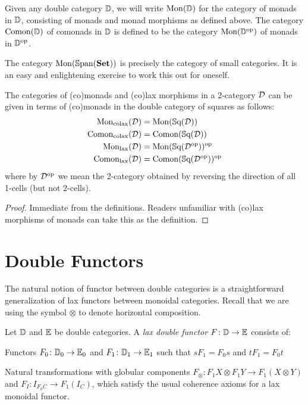 \begin{definition}
	Given any double category $\mathbb{D}$, we will write $\mathrm{Mon}(\mathbb{D})$ for the category of monads in $\mathbb{D}$, consisting of monads and monad morphisms as defined above. The category $\mathrm{Comon}(\mathbb{D})$ of comonads in $\mathbb{D}$ is defined to be the category $\mathrm{Mon}(\mathbb{D}^{\text{op}})$ of monads in $\mathbb{D}^{\text{op}}$.
\end{definition}

\begin{example}
	The category $\mathrm{Mon}(\mathbb{S}\mathrm{pan}(\mathbf{Set}))$ is precisely the category of small categories. It is an easy and enlightening exercise to work this out for oneself.
\end{example}

\begin{proposition}
	The categories of (co)monads and (co)lax morphisms in a 2-category $\mathcal{D}$ can be given in terms of (co)monads in the double category of squares as follows:
	\begin{align*}
		\mathrm{Mon}_{\text{colax}}(\mathcal{D}) &= \mathrm{Mon}(\mathbb{S}\mathrm{q}(\mathcal{D})) \\
		\mathrm{Comon}_{\text{colax}}(\mathcal{D}) &= \mathrm{Comon}(\mathbb{S}\mathrm{q}(\mathcal{D})) \\
		\mathrm{Mon}_{\text{lax}}(\mathcal{D}) &= \mathrm{Mon}(\mathbb{S}\mathrm{q}(\mathcal{D}^{\text{op}}))^{\text{op}} \\
		\mathrm{Comon}_{\text{lax}}(\mathcal{D}) &= \mathrm{Comon}(\mathbb{S}\mathrm{q}(\mathcal{D}^{\text{op}}))^{\text{op}}
	\end{align*}
	where by $\mathcal{D}^{\text{op}}$ we mean the 2-category obtained by reversing the direction of all 1-cells (but not 2-cells).
\end{proposition}
\begin{proof}
	Immediate from the definitions. Readers unfamiliar with (co)lax morphisms of monads can take this as the definition.
\end{proof}

\section{Double Functors}

The natural notion of functor between double categories is a straightforward generalization of lax functors between monoidal categories. Recall that we are using the symbol $\otimes$ to denote horizontal composition.

\begin{definition}\label{Def:LaxDblFunc}
	Let $\mathbb{D}$ and $\mathbb{E}$ be double categories. A \emph{lax double functor} $F\colon\mathbb{D}\to\mathbb{E}$ consists of:
	\begin{compactitem}
		\item Functors $F_0\colon\mathbb{D}_0 \to\mathbb{E}_0$ and $F_1\colon\mathbb{D}_1 \to\mathbb{E}_1$ such that $sF_1=F_0s$ and $tF_1=F_0t$
		\item Natural transformations with globular components $F_{\otimes}\colon F_1X\otimes F_1Y\to F_1(X\otimes Y)$ and $F_I\colon I_{F_0C}\to F_1(I_C)$, which satisfy the usual coherence axioms for a lax monoidal functor.
	\end{compactitem}
\end{definition}

